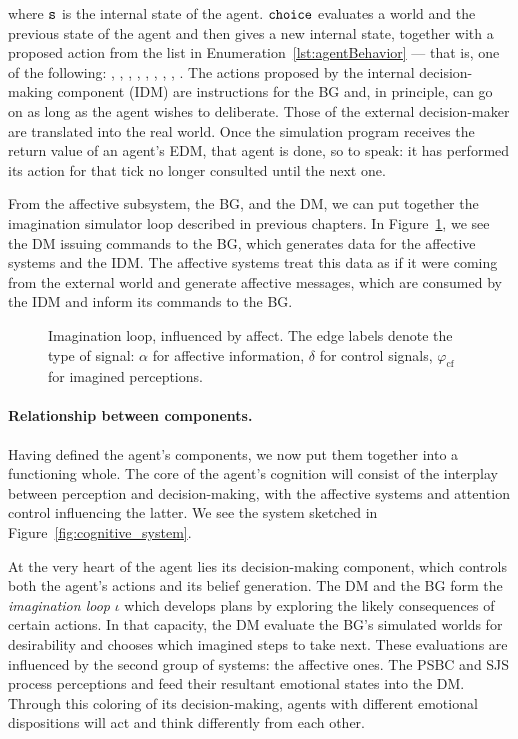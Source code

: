 where $\mathtt{s}$ is the internal state of the agent. $\mathtt{choice}$ evaluates a world and the previous state of the agent and then gives a new internal state, together with a proposed action from the list in Enumeration~\ref{lst:agentBehavior} --- that is, one of the following: , , , , , , , , . The actions proposed by the internal decision-making component (IDM) are instructions for the BG and, in principle, can go on as long as the agent wishes to deliberate. Those of the external decision-maker are translated into the real world. Once the simulation program receives the return value of an agent's EDM, that agent is done, so to speak: it has performed its action for that tick no longer consulted until the next one.

From the affective subsystem, the BG, and the DM, we can put together the imagination simulator loop described in previous chapters. In Figure~\ref{fig:cognitive_system_dm}, we see the DM issuing commands to the BG, which generates data for the affective systems and the IDM. The affective systems treat this data as if it were coming from the external world and generate affective messages, which are consumed by the IDM and inform its commands to the BG.

\begin{figure}
	\centering
	
	\caption{Imagination loop, influenced by affect. The edge labels denote the type of signal: $\alpha$ for affective information, $\delta$ for control signals, $\varphi_{\mathrm{cf}}$ for imagined perceptions.}
	\label{fig:cognitive_system_dm}
\end{figure}

\paragraph{Relationship between components.} Having defined the agent's components, we now put them together into a functioning whole. The core of the agent's cognition will consist of the interplay between perception and decision-making, with the affective systems and attention control influencing the latter. We see the system sketched in Figure~\ref{fig:cognitive_system}.

At the very heart of the agent lies its decision-making component, which controls both the agent's actions and its belief generation. The DM and the BG form the {\em imagination loop} $\iota$ which develops plans by exploring the likely consequences of certain actions. In that capacity, the DM evaluate the BG's simulated worlds for desirability and chooses which imagined steps to take next. These evaluations are influenced by the second group of systems: the affective ones. The PSBC and SJS process perceptions and feed their resultant emotional states into the DM. Through this coloring of its decision-making, agents with different emotional dispositions will act and think differently from each other.

